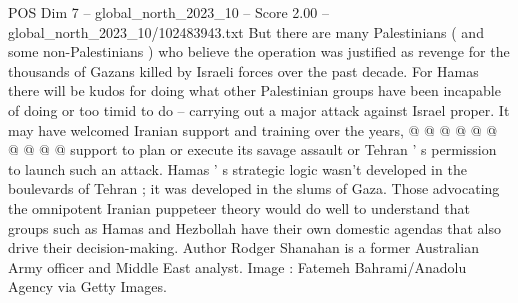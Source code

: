 \begin{textsample}{POS Dim 7 – global\_north\_2023\_10 – Score 2.00 – global\_north\_2023\_10/102483943.txt}
But there are many Palestinians ( and some non-Palestinians ) who believe the operation was justified as revenge for the thousands of Gazans killed by Israeli forces over the past decade.
For Hamas there will be kudos for doing what other Palestinian groups have been incapable of doing or too timid to do -- carrying out a major attack against Israel proper.
It may have welcomed Iranian support and training over the years, @ @ @ @ @ @ @ @ @ @ support to plan or execute its savage assault or Tehran ' s permission to launch such an attack.
Hamas ' s strategic logic wasn't developed in the boulevards of Tehran ; it was developed in the slums of Gaza.
Those advocating the omnipotent Iranian puppeteer theory would do well to understand that groups such as Hamas and Hezbollah have their own domestic agendas that also drive their decision-making.
Author Rodger Shanahan is a former Australian Army officer and Middle East analyst.
Image : Fatemeh Bahrami/Anadolu Agency via Getty Images.

\end{textsample}
